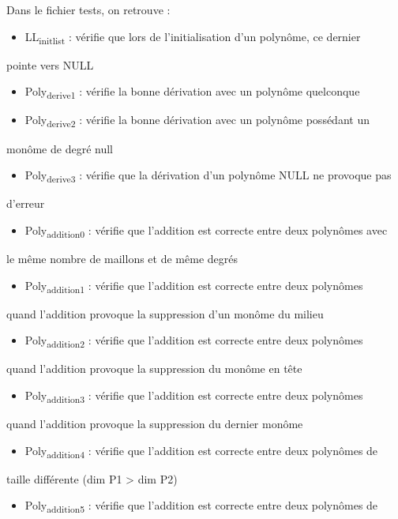\documentclass[11pt]{article}
\begin{document}
Dans le fichier tests, on retrouve :
\begin{itemize}
\item LL\textsubscript{init}\textsubscript{list} : vérifie que lors de l'initialisation d'un polynôme, ce dernier
\end{itemize}
pointe vers NULL
\begin{itemize}
\item Poly\textsubscript{derive1} : vérifie la bonne dérivation avec un polynôme quelconque
\item Poly\textsubscript{derive2} : vérifie la bonne dérivation avec un polynôme possédant un
\end{itemize}
monôme de degré null
\begin{itemize}
\item Poly\textsubscript{derive3} : vérifie que la dérivation d'un polynôme NULL ne provoque pas
\end{itemize}
d'erreur
\begin{itemize}
\item Poly\textsubscript{addition0} : vérifie que l'addition est correcte entre deux polynômes avec
\end{itemize}
le même nombre de maillons et de même degrés
\begin{itemize}
\item Poly\textsubscript{addition1} : vérifie que l'addition est correcte entre deux polynômes
\end{itemize}
quand l'addition provoque la suppression d'un monôme du milieu
\begin{itemize}
\item Poly\textsubscript{addition2} : vérifie que l'addition est correcte entre deux polynômes
\end{itemize}
quand l'addition provoque la suppression du monôme en tête
\begin{itemize}
\item Poly\textsubscript{addition3} : vérifie que l'addition est correcte entre deux polynômes
\end{itemize}
quand l'addition provoque la suppression du dernier monôme 
\begin{itemize}
\item Poly\textsubscript{addition4} : vérifie que l'addition est correcte entre deux polynômes de
\end{itemize}
taille différente (dim P1 > dim P2)
\begin{itemize}
\item Poly\textsubscript{addition5} :  vérifie que l'addition est correcte entre deux polynômes de
\end{itemize}
\end{document}
